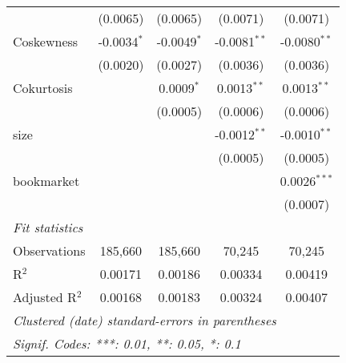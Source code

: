 \begin{table}[H]
\begin{tabular}{lcccc}
                     & (0.0065)       & (0.0065)       & (0.0071)       & (0.0071)\\   
      Coskewness     & -0.0034$^{*}$  & -0.0049$^{*}$  & -0.0081$^{**}$ & -0.0080$^{**}$\\   
                     & (0.0020)       & (0.0027)       & (0.0036)       & (0.0036)\\   
      Cokurtosis     &                & 0.0009$^{*}$   & 0.0013$^{**}$  & 0.0013$^{**}$\\   
                     &                & (0.0005)       & (0.0006)       & (0.0006)\\   
      size           &                &                & -0.0012$^{**}$ & -0.0010$^{**}$\\   
                     &                &                & (0.0005)       & (0.0005)\\   
      bookmarket     &                &                &                & 0.0026$^{***}$\\   
                     &                &                &                & (0.0007)\\   
      \midrule
      \emph{Fit statistics}\\
      Observations   & 185,660        & 185,660        & 70,245         & 70,245\\  
      R$^2$          & 0.00171        & 0.00186        & 0.00334        & 0.00419\\  
      Adjusted R$^2$ & 0.00168        & 0.00183        & 0.00324        & 0.00407\\  
      \midrule \midrule
      \multicolumn{5}{l}{\emph{Clustered (date) standard-errors in parentheses}}\\
      \multicolumn{5}{l}{\emph{Signif. Codes: ***: 0.01, **: 0.05, *: 0.1}}\\
   \end{tabular}
\end{table}
